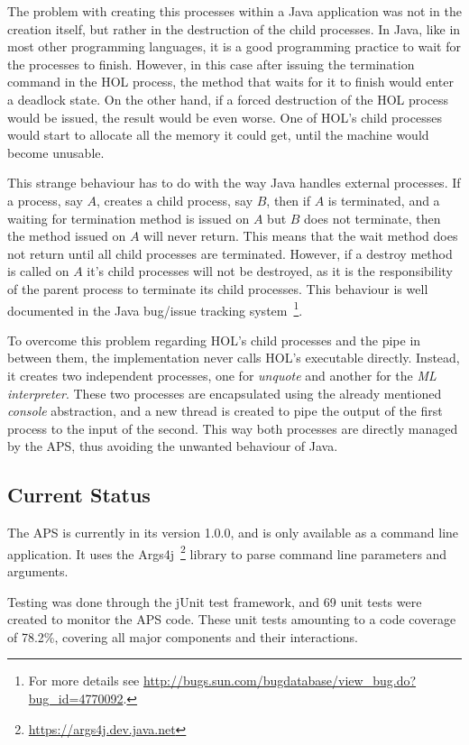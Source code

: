 \documentclass[]{article}
\begin{document}
The problem with creating this processes within a Java application was not in the creation itself, but rather in the destruction of the child processes.
In Java, like in most other programming languages, it is a good programming practice to wait for the processes to finish.
However, in this case after issuing the termination command in the HOL process, the method that waits for it to finish would enter a deadlock state.
On the other hand, if a forced destruction of the HOL process would be issued, the result would be even worse.
One of HOL's child processes would start to allocate all the memory it could get, until the machine would become unusable.

This strange behaviour has to do with the way Java handles external processes.
If a process, say $A$, creates a child process, say $B$, then if $A$ is terminated, and a waiting for termination method is issued on $A$ but $B$ does not terminate, then the method issued on $A$ will never return.
This means that the wait method does not return until all child processes are terminated.
However, if a destroy method is called on $A$ it's child processes will not be destroyed, as it is the responsibility of the parent process to terminate its child processes.
This behaviour is well documented in the Java bug/issue tracking system~\footnote{For more details see \url{http://bugs.sun.com/bugdatabase/view_bug.do?bug_id=4770092}.}.

To overcome this problem regarding HOL's child processes and the pipe in between them, the implementation never calls HOL's executable directly.
Instead, it creates two independent processes, one for \emph{unquote} and another for the \emph{ML interpreter}.
These two processes are encapsulated using the already mentioned \emph{console} abstraction, and a new thread is created to pipe the output of the first process to the input of the second.
This way both processes are directly managed by the APS, thus avoiding the unwanted behaviour of Java.

\subsection{Current Status}

The APS is currently in its version 1.0.0, and is only available as a command line application.
It uses the Args4j~\footnote{\url{https://args4j.dev.java.net}} library to parse command line parameters and arguments.

Testing was done through the jUnit test framework, and 69 unit tests were created to monitor the APS code.
These unit tests amounting to a code coverage of 78.2\%, covering all major components and their interactions.
\end{document}
